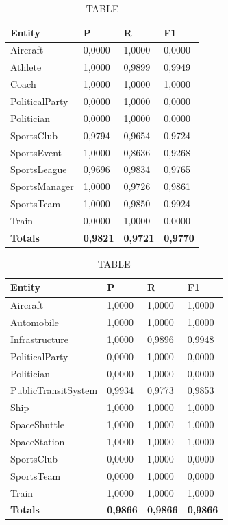 \documentclass[thesis=M,english]{FITthesis}[2018/05/30]
\begin{document}
	\begin{table}[H]\centering
		\caption{TABLE}
		\label{}
		\begin{tabular}{|l|l|l|l|}
			\hline {\textbf{Entity}} & {\textbf{P}} & {\textbf{R}} & {\textbf{F1}}\\\hline
				Aircraft & 0,0000 & 1,0000 & 0,0000\\
				Athlete & 1,0000 & 0,9899 & 0,9949\\
				Coach & 1,0000 & 1,0000 & 1,0000\\
				PoliticalParty & 0,0000 & 1,0000 & 0,0000\\
				Politician & 0,0000 & 1,0000 & 0,0000\\
				SportsClub & 0,9794 & 0,9654 & 0,9724\\
				SportsEvent & 1,0000 & 0,8636 & 0,9268\\
				SportsLeague & 0,9696 & 0,9834 & 0,9765\\
				SportsManager & 1,0000 & 0,9726 & 0,9861\\				
				SportsTeam & 1,0000 & 0,9850 & 0,9924\\
				Train & 0,0000 & 1,0000 & 0,0000\\\hline
				\textbf{Totals} & \textbf{0,9821} & \textbf{0,9721} & \textbf{0,9770}\\\hline
		\end{tabular}
	\end{table}	

	\begin{table}[H]\centering
		\caption{TABLE}
		\label{}
		\begin{tabular}{|l|l|l|l|}
			\hline {\textbf{Entity}} & {\textbf{P}} & {\textbf{R}} & {\textbf{F1}}\\\hline
				Aircraft & 1,0000 & 1,0000 & 1,0000\\
				Automobile & 1,0000 & 1,0000 & 1,0000\\				
				Infrastructure & 1,0000 & 0,9896 & 0,9948\\
				PoliticalParty & 0,0000 & 1,0000 & 0,0000\\				
				Politician & 0,0000 & 1,0000 & 0,0000\\				
				PublicTransitSystem & 0,9934 & 0,9773 & 0,9853\\
				Ship & 1,0000 & 1,0000 & 1,0000\\				
				SpaceShuttle & 1,0000 & 1,0000 & 1,0000\\
				SpaceStation & 1,0000 & 1,0000 & 1,0000\\
				SportsClub & 0,0000 & 1,0000 & 0,0000\\
				SportsTeam & 0,0000 & 1,0000 & 0,0000\\
				Train & 1,0000 & 1,0000 & 1,0000\\\hline
				\textbf{Totals} & \textbf{0,9866} & \textbf{0,9866} & \textbf{0,9866}\\\hline
		\end{tabular}
	\end{table}		
	
\end{document}
